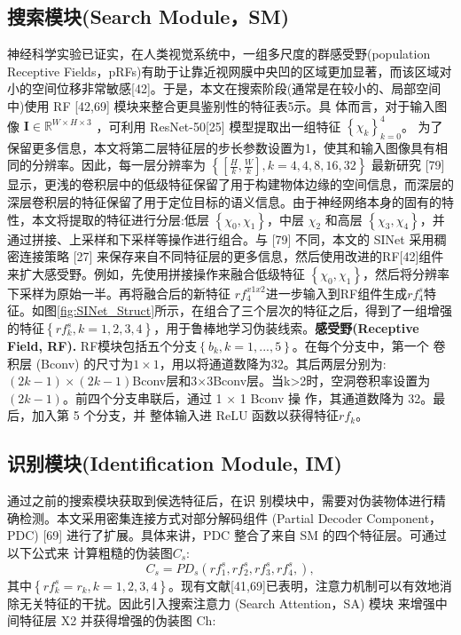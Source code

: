 \documentclass[final]{cvpr}
\renewcommand{\figref}[1]{图\ref{#1}}
\begin{document}
\subsection{搜索模块(Search Module，SM)}
神经科学实验已证实，在人类视觉系统中，一组多尺度的群感受野(population Receptive Fields，pRFs)有助于让靠近视网膜中央凹的区域更加显著，而该区域对小的空间位移非常敏感[42]。于是，本文在搜索阶段(通常是在较小的、局部空间中)使用 RF [42,69] 模块来整合更具鉴别性的特征表5示。具 体而言，对于输入图像 
$\mathbf{I} \in \mathbb{R}^{W\times H\times3 }$ %
，可利用 ResNet-50[25] 模型提取出一组特征
$\left \{ \chi_{k}  \right \}_{k=0}^{4}$。
为了保留更多信息，本文将第二层特征层的步长参数设置为1，使其和输入图像具有相同的分辨率。因此，每一层分辨率为
$\left \{ \left [  \frac{H}{k},\frac{W}{k}  \right ] , k=4,4,8,16,32\right \} $
最新研究 [79] 显示，更浅的卷积层中的低级特征保留了用于构建物体边缘的空间信息，而深层的深层卷积层的特征保留了用于定位目标的语义信息。由于神经网络本身的固有的特性，本文将提取的特征进行分层:低层 
$\left \{ \chi_{0},\chi_{1} \right \} $，中层 $\chi_{2}$ 和高层
$\left \{ \chi_{3},\chi_{4} \right \} $，并通过拼接、上采样和下采样等操作进行组合。与 [79] 不同，本文的 SINet 采用稠密连接策略 [27] 来保存来自不同特征层的更多信息，然后使用改进的RF[42]组件来扩大感受野。例如，先使用拼接操作来融合低级特征 
$\left \{ \chi_{0},\chi_{1} \right \} $，然后将分辨率下采样为原始一半。再将融合后的新特征
$rf_{4}^{x1x2} $进一步输入到RF组件生成$rf_{4}^{s}$特征。如\figref{fig:SINet_Struct}所示，在组合了三个层次的特征之后，得到了一组增强的特征$\left\{rf_{k}^{s},k=1,2,3,4\right\}$，用于鲁棒地学习伪装线索。\textbf{感受野(Receptive Field, RF). }RF模块包括五个分支$\left \{ b_{k} , k=1,...,5 \right \}$。在每个分支中，第一个 卷积层 (Bconv) 的尺寸为$1\times1$，用以将通道数降为32。其后两层分别为:$(2k-1)\times(2k-1)$Bconv层和3×3Bconv层。当k>2时，空洞卷积率设置为$(2k − 1)$。前四个分支串联后，通过 1 × 1 Bconv 操 作，其通道数降为 32。最后，加入第 5 个分支，并 整体输入进 ReLU 函数以获得特征$rf_{k}$。


\subsection{识别模块(Identification Module, IM)}
通过之前的搜索模块获取到侯选特征后，在识 别模块中，需要对伪装物体进行精确检测。本文采用密集连接方式对部分解码组件 (Partial Decoder Component，PDC) [69] 进行了扩展。具体来讲，PDC 整合了来自 SM 的四个特征层。可通过以下公式来 计算粗糙的伪装图$C_{s}$:
\begin{equation}\label{equ:Partial_Decoder_Component}
   C_{s} =PD_{s} \left ( rf_{1}^{s}, rf_{2}^{s}, rf_{3}^{s}, rf_{4}^{s}, \right ) ,
\end{equation}
其中$\left\{rf_{k}^{s}=r_{k},k=1,2,3,4\right\}$。现有文献[41,69]已表明，注意力机制可以有效地消除无关特征的干扰。因此引入搜索注意力 (Search Attention，SA) 模块 来增强中间特征层 X2 并获得增强的伪装图 Ch:
\end{document}
